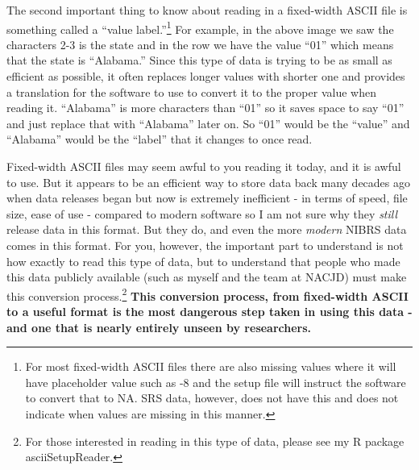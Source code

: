 \documentclass[
]{krantz}
\begin{document}
The second important thing to know about reading in a
fixed-width ASCII file is something called a ``value
label.''\footnote{For most fixed-width ASCII files there are
  also missing values where it will have placeholder value
  such as -8 and the setup file will instruct the software
  to convert that to NA. SRS data, however, does not have
  this and does not indicate when values are missing in this
  manner.} For example, in the above image we saw the
characters 2-3 is the state and in the row we have the value
``01'' which means that the state is ``Alabama.'' Since this
type of data is trying to be as small as efficient as
possible, it often replaces longer values with shorter one
and provides a translation for the software to use to
convert it to the proper value when reading it. ``Alabama''
is more characters than ``01'' so it saves space to say
``01'' and just replace that with ``Alabama'' later on. So
``01'' would be the ``value'' and ``Alabama'' would be the
``label'' that it changes to once read.

Fixed-width ASCII files may seem awful to you reading it
today, and it is awful to use. But it appears to be an
efficient way to store data back many decades ago when data
releases began but now is extremely inefficient - in terms
of speed, file size, ease of use - compared to modern
software so I am not sure why they \emph{still} release data
in this format. But they do, and even the more \emph{modern}
NIBRS data comes in this format. For you, however, the
important part to understand is not how exactly to read this
type of data, but to understand that people who made this
data publicly available (such as myself and the team at
NACJD) must make this conversion process.\footnote{For those
  interested in reading in this type of data, please see my
  R package asciiSetupReader.} \textbf{This conversion
process, from fixed-width ASCII to a useful format is the
most dangerous step taken in using this data - and one that
is nearly entirely unseen by researchers.}
\end{document}
